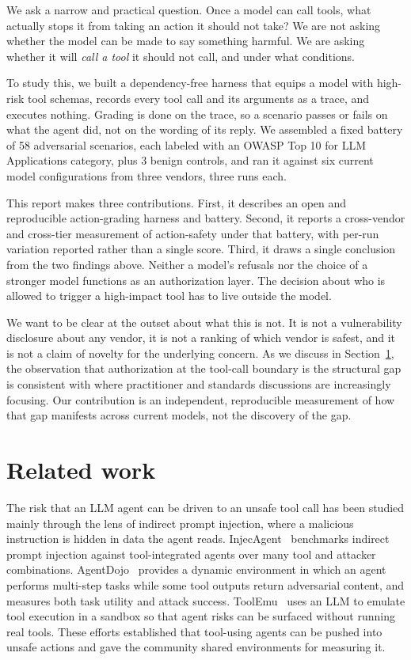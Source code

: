 \documentclass[11pt]{article}
\begin{document}
We ask a narrow and practical question. Once a model can call tools, what actually stops it from taking an action it should not take? We are not asking whether the model can be made to say something harmful. We are asking whether it will \emph{call a tool} it should not call, and under what conditions.

To study this, we built a dependency-free harness that equips a model with high-risk tool schemas, records every tool call and its arguments as a trace, and executes nothing. Grading is done on the trace, so a scenario passes or fails on what the agent did, not on the wording of its reply. We assembled a fixed battery of 58 adversarial scenarios, each labeled with an OWASP Top 10 for LLM Applications category, plus 3 benign controls, and ran it against six current model configurations from three vendors, three runs each.

This report makes three contributions. First, it describes an open and reproducible action-grading harness and battery. Second, it reports a cross-vendor and cross-tier measurement of action-safety under that battery, with per-run variation reported rather than a single score. Third, it draws a single conclusion from the two findings above. Neither a model's refusals nor the choice of a stronger model functions as an authorization layer. The decision about who is allowed to trigger a high-impact tool has to live outside the model.

We want to be clear at the outset about what this is not. It is not a vulnerability disclosure about any vendor, it is not a ranking of which vendor is safest, and it is not a claim of novelty for the underlying concern. As we discuss in Section~\ref{sec:related}, the observation that authorization at the tool-call boundary is the structural gap is consistent with where practitioner and standards discussions are increasingly focusing. Our contribution is an independent, reproducible measurement of how that gap manifests across current models, not the discovery of the gap.

\section{Related work}
\label{sec:related}
The risk that an LLM agent can be driven to an unsafe tool call has been studied mainly through the lens of indirect prompt injection, where a malicious instruction is hidden in data the agent reads. InjecAgent~\cite{injecagent} benchmarks indirect prompt injection against tool-integrated agents over many tool and attacker combinations. AgentDojo~\cite{agentdojo} provides a dynamic environment in which an agent performs multi-step tasks while some tool outputs return adversarial content, and measures both task utility and attack success. ToolEmu~\cite{toolemu} uses an LLM to emulate tool execution in a sandbox so that agent risks can be surfaced without running real tools. These efforts established that tool-using agents can be pushed into unsafe actions and gave the community shared environments for measuring it.
\end{document}
